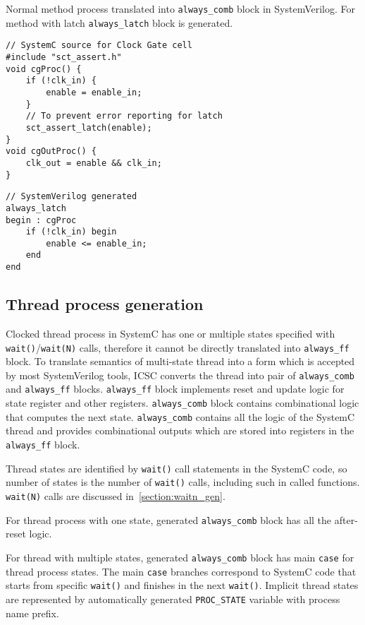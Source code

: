 Normal method process translated into {\tt always\_comb} block in SystemVerilog. For method with latch {\tt always\_latch} block is generated.

\begin{lstlisting}[style=mycpp]
// SystemC source for Clock Gate cell
#include "sct_assert.h"
void cgProc() {
    if (!clk_in) {
        enable = enable_in;
    }
    // To prevent error reporting for latch
    sct_assert_latch(enable);
}
void cgOutProc() {
    clk_out = enable && clk_in;
}
\end{lstlisting}
%
\begin{lstlisting}[style=myverilog]
// SystemVerilog generated 
always_latch
begin : cgProc
    if (!clk_in) begin
        enable <= enable_in;
    end
end
\end{lstlisting}

\subsection{Thread process generation}\label{section:thread_gen}

Clocked thread process in SystemC has one or multiple states specified with {\tt wait()}/{\tt wait(N)} calls, therefore it cannot be directly translated into {\tt always\_ff} block. 
To translate semantics of multi-state thread into a form which is accepted by most SystemVerilog tools, ICSC converts the thread into pair of {\tt always\_comb} and {\tt always\_ff} blocks. {\tt always\_ff} block implements reset and update logic for state register and other registers. {\tt always\_comb} block contains combinational logic that computes the next state. {\tt always\_comb} contains all the logic of the SystemC thread and provides combinational outputs which are stored into registers in the {\tt always\_ff} block. 

Thread states are identified by {\tt wait()} call statements in the SystemC code, so number of states is the number of {\tt wait()} calls, including such in called functions. {\tt wait(N)} calls are discussed in~\ref{section:waitn_gen}. 

For thread process with one state, generated {\tt always\_comb} block has all the after-reset logic.

For thread with multiple states, generated {\tt always\_comb} block has main {\tt case} for thread process states. The main {\tt case} branches correspond to SystemC code that starts from specific {\tt wait()} and finishes in the next {\tt wait()}. Implicit thread states are represented by automatically generated {\tt PROC\_STATE} variable with process name prefix. 

